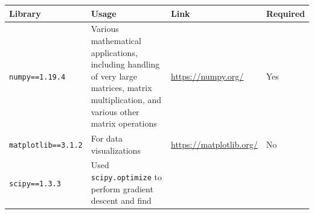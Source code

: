 \documentclass[11pt]{article}
\begin{document}
\begin{longtable}[]{@{}llll@{}}
\toprule
\begin{minipage}[b]{0.22\columnwidth}\raggedright
Library\strut
\end{minipage} & \begin{minipage}[b]{0.22\columnwidth}\raggedright
Usage\strut
\end{minipage} & \begin{minipage}[b]{0.22\columnwidth}\raggedright
Link\strut
\end{minipage} & \begin{minipage}[b]{0.22\columnwidth}\raggedright
Required\strut
\end{minipage}\tabularnewline
\midrule
\endhead
\begin{minipage}[t]{0.22\columnwidth}\raggedright
\texttt{numpy==1.19.4}\strut
\end{minipage} & \begin{minipage}[t]{0.22\columnwidth}\raggedright
Various mathematical applications, including handling of very large
matrices, matrix multiplication, and various other matrix
operations\strut
\end{minipage} & \begin{minipage}[t]{0.22\columnwidth}\raggedright
\url{https://numpy.org/}\strut
\end{minipage} & \begin{minipage}[t]{0.22\columnwidth}\raggedright
Yes\strut
\end{minipage}\tabularnewline
\begin{minipage}[t]{0.22\columnwidth}\raggedright
\texttt{matplotlib==3.1.2}\strut
\end{minipage} & \begin{minipage}[t]{0.22\columnwidth}\raggedright
For data visualizations\strut
\end{minipage} & \begin{minipage}[t]{0.22\columnwidth}\raggedright
\url{https://matplotlib.org/}\strut
\end{minipage} & \begin{minipage}[t]{0.22\columnwidth}\raggedright
No\strut
\end{minipage}\tabularnewline
\begin{minipage}[t]{0.22\columnwidth}\raggedright
\texttt{scipy==1.3.3}\strut
\end{minipage} & \begin{minipage}[t]{0.22\columnwidth}\raggedright
Used \texttt{scipy.optimize} to perform gradient descent and find

\end{minipage}
\end{longtable}
\end{document}
